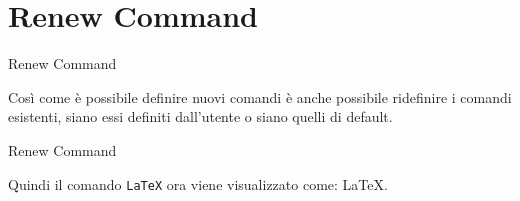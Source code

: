 \section{Renew Command}
\begin{frame}{Renew Command}

Cos\`i come \`e possibile definire nuovi comandi \`e anche possibile ridefinire i comandi esistenti, siano essi definiti dall'utente o siano quelli di default.

\begin{esempio}{Renew Command}
\end{esempio}
Quindi il comando \texttt{\LaTeX} ora viene visualizzato come:
\LaTeX.

\end{frame}